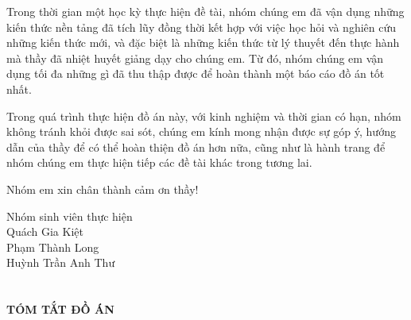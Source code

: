 \documentclass[a4paper]{report}
\begin{document}
Trong thời gian một học kỳ thực hiện đề tài, nhóm chúng em đã vận dụng
những kiến thức nền tảng đã tích lũy đồng thời kết hợp với việc học hỏi và nghiên
cứu những kiến thức mới, và đặc biệt là những kiến thức từ lý thuyết đến thực hành
mà thầy đã nhiệt huyết giảng dạy cho chúng em. Từ đó, nhóm chúng em vận dụng tối
đa những gì đã thu thập được để hoàn thành một báo cáo đồ án tốt nhất.

Trong quá trình thực hiện đồ án này, với kinh nghiệm và thời gian có
hạn, nhóm không tránh khỏi được sai sót, chúng em kính mong nhận được sự góp ý,
hướng dẫn của thầy để có thể hoàn thiện đồ án hơn nữa, cũng như là hành trang để
nhóm chúng em thực hiện tiếp các đề tài khác trong tương lai.

Nhóm em xin chân thành cảm ơn thầy!

\vspace{1cm}

\begin{flushright}
    Nhóm sinh viên thực hiện\\
    Quách Gia Kiệt \\
    Phạm Thành Long \\
    Huỳnh Trần Anh Thư \\
\end{flushright}

\newpage

\tableofcontents
\newpage

\chapter*{}
\begin{center}
    \Large\bfseries TÓM TẮT ĐỒ ÁN
\end{center}

\setcounter{page}{1}
\pagestyle{fancy}



\newpage







\renewcommand{\bibname}{Tài liệu tham khảo}

\nocite{*}



% 
\end{document}
